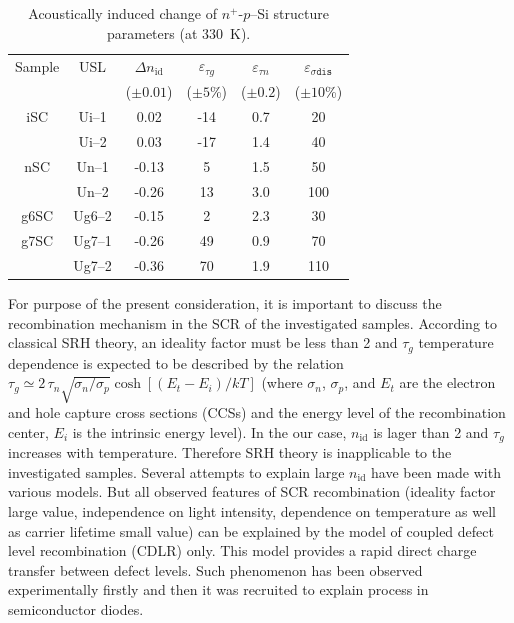 \documentclass[aip,jap, amsmath,amssymb,reprint]{revtex4-1}
\begin{document}
\begin{table}
\caption{\label{tabAIchange}Acoustically induced change of $n^+$-$p$--Si structure parameters (at 330~K).
}
\begin{ruledtabular}
\begin{tabular}{cccccc}
Sample&USL&$\Delta n_{\mathrm{id}}$ &$\varepsilon_{\tau g}$ &$\varepsilon_{\tau n}$ &$\varepsilon_{\sigma\mathtt{dis}}$ \\
&&\mbox{($\pm0.01$)}&($\pm5$\%)&($\pm0.2$)&($\pm10$\%)\\
\hline
iSC&Ui--1&0.02&-14&0.7&20\\
&Ui--2&0.03&-17&1.4&40\\
nSC&Un--1&-0.13&5&1.5&50\\
&Un--2&-0.26&13&3.0&100\\
g6SC&Ug6--2&-0.15&2&2.3&30\\
g7SC&Ug7--1&-0.26&49&0.9&70\\
&Ug7--2&-0.36&70&1.9&110\\
\end{tabular}
\end{ruledtabular}
\end{table}


For purpose of the present consideration, it is important to discuss the recombination mechanism in the SCR of the investigated samples.
According to classical SRH theory, an ideality factor must be less than 2 and
$\tau_g$ temperature dependence is expected \cite{TAUg:Schroder,TAUg:Aharoni} to be described by the relation  $\tau_g\simeq2\,\tau_n\sqrt{\sigma_n/\sigma_p}\cosh\left[\left(E_t-E_i\right)/kT\right]$
(where $\sigma_n$, $\sigma_p$, and  $E_t$ are the electron and hole capture cross sections (CCSs) and the energy  level of  the  recombination  center,
$E_i$  is the  intrinsic  energy level).
In the our case, $n_{\mathrm{id}}$ is lager than 2 and $\tau_g$ increases with temperature.
Therefore SRH theory is inapplicable to the investigated samples.
Several attempts to explain large $n_{\mathrm{id}}$ have been made with various models.\cite{Heide,Beier,Shah,Kaminski_n}
But all observed features of SCR recombination (ideality factor large value, independence on light intensity, dependence on temperature
as well as carrier lifetime small value) can be explained by the model of coupled defect level recombination (CDLR) \cite{CDLR:JAP1995,CDLR:JAP} only.
This model provides a rapid  direct  charge  transfer  between  defect levels.
Such phenomenon has been observed experimentally firstly \cite{DAPR:Chen1991,DAPR:Chen1994} and then it was recruited to explain process in semiconductor diodes. \cite{CDLR:JAP1995,CDLR:JAP,CDLR:SSP}
\end{document}
